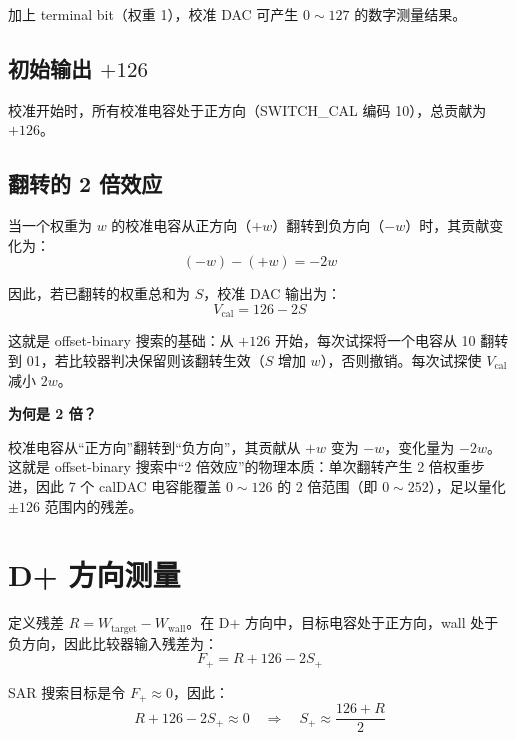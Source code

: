\documentclass[
  UTF8,
  a4paper,
  11pt,
  oneside,
  fontset=fandol
]{ctexrep}
\newenvironment{tipbox}[1]{%
  \begin{center}
  \begin{minipage}{0.94\textwidth}
  \colorbox{lightteal}{%
    \parbox{0.96\textwidth}{\textbf{#1}}}
  \vspace{0.35em}\par
}{%
  \end{minipage}
  \end{center}
}
\newcommand{\Vcal}{V_{\mathrm{cal}}}
\begin{document}
加上 terminal bit（权重 1），校准 DAC 可产生 $0 \sim 127$ 的数字测量结果。

\section{初始输出 $+126$}

校准开始时，所有校准电容处于正方向（SWITCH\_CAL 编码 10），总贡献为 $+126$。

\section{翻转的 2 倍效应}

当一个权重为 $w$ 的校准电容从正方向（$+w$）翻转到负方向（$-w$）时，其贡献变化为：
\begin{equation}
(-w) - (+w) = -2w
\end{equation}

因此，若已翻转的权重总和为 $S$，校准 DAC 输出为：
\begin{equation}
\boxed{\Vcal = 126 - 2S}
\label{eq:Vcal}
\end{equation}

这就是 offset-binary 搜索的基础：从 $+126$ 开始，每次试探将一个电容从 10 翻转到 01，若比较器判决保留则该翻转生效（$S$ 增加 $w$），否则撤销。每次试探使 $\Vcal$ 减小 $2w$。

\begin{tipbox}{为何是 2 倍？}
校准电容从“正方向”翻转到“负方向”，其贡献从 $+w$ 变为 $-w$，变化量为 $-2w$。这就是 offset-binary 搜索中“2 倍效应”的物理本质：单次翻转产生 2 倍权重步进，因此 7 个 calDAC 电容能覆盖 $0 \sim 126$ 的 2 倍范围（即 $0 \sim 252$），足以量化 $\pm 126$ 范围内的残差。
\end{tipbox}

\chapter{D+ 方向测量}

定义残差 $R = W_{\mathrm{target}} - W_{\mathrm{wall}}$。在 D+ 方向中，目标电容处于正方向，wall 处于负方向，因此比较器输入残差为：
\begin{equation}
\boxed{F_+ = R + 126 - 2S_+}
\label{eq:Fplus}
\end{equation}

SAR 搜索目标是令 $F_+ \approx 0$，因此：
\begin{equation}
R + 126 - 2S_+ \approx 0 \quad \Longrightarrow \quad S_+ \approx \frac{126 + R}{2}
\end{equation}
\end{document}
